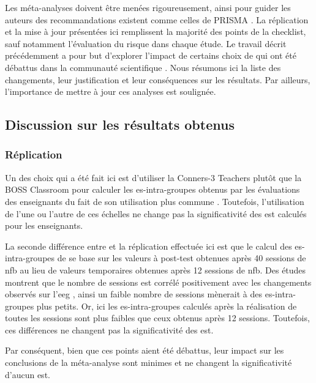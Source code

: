 Les méta-analyses doivent être menées rigoureusement, ainsi pour guider les auteurs des recommandations existent comme celles de PRISMA \citep{Moher2009}.
La réplication et la mise à jour présentées ici remplissent la majorité des points de la checklist, sauf notamment l'évaluation du risque dans chaque étude. 
Le travail décrit précédemment a pour but d'explorer l'impact de certains choix de \citet{Cortese2016} qui ont été débattus dans la communauté scientifique 
\citep{Micoulaud2016}. Nous résumons ici la liste des changements, leur justification et leur conséquences sur les résultats. Par ailleurs, l'importance de mettre 
à jour ces analyses est soulignée.

\subsection{Discussion sur les résultats obtenus} \label{replication_and_update}

\subsubsection{Réplication}

Un des choix qui a été fait ici est d'utiliser la Conners-3 Teachers \citep{Conners2008} plutôt que la BOSS Classroom \citep{Shapiro2010} 
pour calculer les \gls{es}-intra-groupes obtenus par les évaluations des enseignants du fait de son utilisation plus commune \citep{Christiansen2014, Bluschke2016}.
Toutefois, l'utilisation de l'une ou l'autre de ces échelles ne change pas la significativité des \gls{est} calculés pour les enseignants. 

La seconde différence entre \citep{Cortese2016} et la réplication effectuée ici est que le calcul des \gls{es}-intra-groupes de \citet{Arnold2014} se base 
sur les valeurs à post-test obtenues après 40 sessions de \gls{nfb} au lieu de valeurs temporaires obtenues après 12 sessions de \gls{nfb}. Des études montrent
que le nombre de sessions est corrélé positivement avec les changements observés sur l'\gls{eeg} \citep{Vernon2004}, ainsi un faible nombre de sessions mènerait
à des \gls{es}-intra-groupes plus petits. Or, ici les \gls{es}-intra-groupes calculés après la réalisation de toutes les sessions sont plus faibles que ceux 
obtenus après 12 sessions. Toutefois, ces différences ne changent pas la significativité des \gls{est}. 

Par conséquent, bien que ces points aient été débattus, leur impact sur les conclusions de la méta-analyse sont minimes et ne changent la significativité
d'aucun \gls{est}. 


